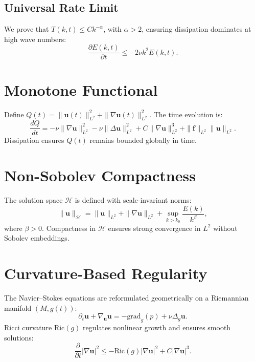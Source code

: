 \documentclass[12pt]{article}
\numberwithin{equation}{section}
\begin{document}
\subsection{Universal Rate Limit}
We prove that \(T(k, t) \leq C k^{-\alpha}\), with \(\alpha > 2\), ensuring dissipation dominates at high wave numbers:
\begin{equation}
    \frac{\partial E(k, t)}{\partial t} \leq -2\nu k^2 E(k, t).
\end{equation}

\section{Monotone Functional}
Define \(Q(t) = \|\mathbf{u}(t)\|_{L^2}^2 + \|\nabla \mathbf{u}(t)\|_{L^2}^2\). The time evolution is:
\begin{equation}
    \frac{dQ}{dt} = -\nu \|\nabla \mathbf{u}\|_{L^2}^2 - \nu \|\Delta \mathbf{u}\|_{L^2}^2 + C \|\nabla \mathbf{u}\|_{L^2}^3 + \|\mathbf{f}\|_{L^2} \|\mathbf{u}\|_{L^2}.
\end{equation}
Dissipation ensures \(Q(t)\) remains bounded globally in time.

\section{Non-Sobolev Compactness}
The solution space \(\mathcal{H}\) is defined with scale-invariant norms:
\begin{equation}
    \|\mathbf{u}\|_{\mathcal{H}} = \|\mathbf{u}\|_{L^2} + \|\nabla \mathbf{u}\|_{L^2} + \sup_{k > k_0} \frac{E(k)}{k^\beta},
\end{equation}
where \(\beta > 0\). Compactness in \(\mathcal{H}\) ensures strong convergence in \(L^2\) without Sobolev embeddings.

\section{Curvature-Based Regularity}
The Navier--Stokes equations are reformulated geometrically on a Riemannian manifold \((M, g(t))\):
\begin{equation}
    \partial_t \mathbf{u} + \nabla_{\mathbf{u}} \mathbf{u} = -\text{grad}_g(p) + \nu \Delta_g \mathbf{u}.
\end{equation}
Ricci curvature \(\text{Ric}(g)\) regulates nonlinear growth and ensures smooth solutions:
\begin{equation}
    \frac{\partial}{\partial t} |\nabla \mathbf{u}|^2 \leq -\text{Ric}(g) |\nabla \mathbf{u}|^2 + C |\nabla \mathbf{u}|^3.
\end{equation}
\end{document}
